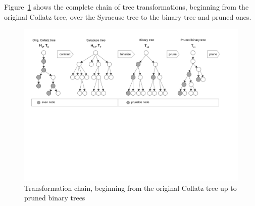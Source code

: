 \newpage
Figure~\ref{fig:tree_transformations} shows the complete chain of tree transformations, beginning from the original Collatz tree, over the Syracuse tree to the binary tree and pruned ones.

\begin{figure}[H]
	\includegraphics[trim=1.1cm 10cm 2.6cm 0.2cm, 
	width=1.00\textwidth,page=1]{figures/tree_transformations.pdf}
	\caption{Transformation chain, beginning from the original Collatz tree up to pruned binary trees}
	\label{fig:tree_transformations}
\end{figure}